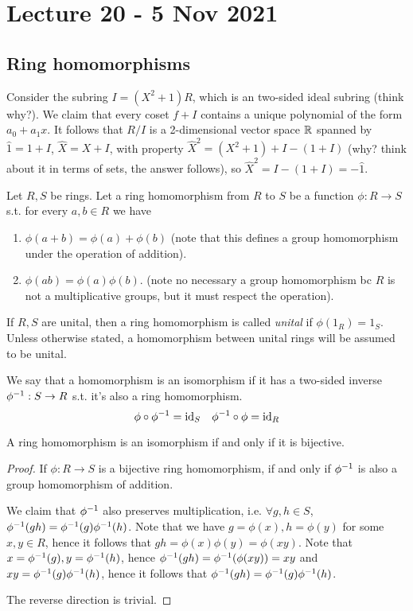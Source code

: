 \section{Lecture 20 - 5 Nov 2021}
\subsection{Ring homomorphisms}
\begin{example}
  Consider the subring $I=(X^2+1)R$, which is an two-sided ideal subring (think why?). We
  claim that every coset $f+I$ contains a unique polynomial of the form $a_0+a_1x$. It
  follows that $R/I$ is a 2-dimensional vector space $\mathbb R$ spanned by $\hat{1}=1+I$,
  $\hat{X}=X+I$, with property $\hat{X}^2=(X^2+1)+I - (1+I)$ (why? think about it in terms
  of sets, the answer follows), so $\hat{X}^2=I-(1+I)= -\hat{1}$.
\end{example}

\begin{definition}
  Let $R,S$ be rings. Let a ring homomorphism from $R$ to $S$ be a function $\phi:R\to S$
  s.t. for every $a,b\in R$ we have 
  \begin{enumerate}
    \item $\phi(a+b)=\phi(a)+\phi(b)$ (note that this defines a group homomorphism under
      the operation of addition).
    \item $\phi(ab)=\phi(a)\phi(b)$. (note no necessary a group homomorphism bc $R$ is not
      a multiplicative groups, but it must respect the operation).
  \end{enumerate}
  If $R,S$ are unital, then a ring homomorphism is called \emph{unital} if
  $\phi(1_R)=1_S$. Unless otherwise stated, a homomorphism between unital rings will be
  assumed to be unital.

  We say that a homomorphism is an isomorphism if it has a two-sided inverse
  $\phi^{-1}:S\to R$ s.t. it's also a ring homomorphism. 
  \[\phi \circ \phi^{-1} = \mathrm{id}_S \quad \phi^{-1}\circ\phi = \mathrm{id}_R\]
  \label{def:ringHomUnital}
\end{definition}

\begin{theorem}
  A ring homomorphism is an isomorphism if and only if it is bijective.
  \label{<+label+>}
\end{theorem}
\begin{proof}
  If $\phi:R\to S$ is a bijective ring homomorphism, if and only if $\phi^{-1}$ is also a group
  homomorphism of addition. 

  We claim that $\phi^{-1}$ also preserves multiplication, i.e.
  $\forall g,h\in S$, $\phi^{-1}(gh)=\phi^{-1}(g)\phi^{-1}(h)$. Note that we have
  $g=\phi(x),h=\phi(y)$ for some $x,y\in R$, hence it follows that
  $gh=\phi(x)\phi(y)=\phi(xy)$. Note that $x=\phi^{-1}(g),y=\phi^{-1}(h)$, hence
  $\phi^{-1}(gh)=\phi^{-1}(\phi(xy))=xy$ and $xy=\phi^{-1}(g)\phi^{-1}(h)$, hence it follows
  that $\phi^{-1}(gh)=\phi^{-1}(g)\phi^{-1}(h)$.

  The reverse direction is trivial.
\end{proof}


